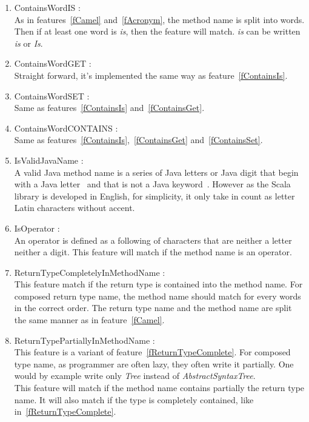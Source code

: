 \documentclass[12pt]{article}
\begin{document}
\begin{enumerate}
\item ContainsWordIS :\label{fContainsIs}\\
	As in features~\ref{fCamel} and~\ref{fAcronym}, the method name is split into words. Then if at least one word is \textit{is}, then the feature will match. \textit{is} can be written \textit{is} or \textit{Is}.
\item ContainsWordGET :\label{fContainsGet}\\
	Straight forward, it's implemented the same way as feature~\ref{fContainsIs}.
\item ContainsWordSET :\label{fContainsSet}\\
	Same as features~\ref{fContainsIs} and~\ref{fContainsGet}.
\item ContainsWordCONTAINS :\label{fContainsContains}\\
	Same as features~\ref{fContainsIs},~\ref{fContainsGet} and~\ref{fContainsSet}.
\item IsValidJavaName :\label{fValidJavaName}\\
	A valid Java method name is a series of Java letters or Java digit that begin with a Java letter~\cite{jls_ident} and that is not a Java keyword~\cite{jls_keyword}. However as the Scala library is developed in English, for simplicity, it only take in count as letter Latin characters without accent.
\item IsOperator :\label{fOperator}\\
	An operator is defined as a following of characters that are neither a letter neither a digit. This feature will match if the method name is an operator.
\item ReturnTypeCompletelyInMethodName :\label{fReturnTypeComplete}\\
	This feature match if the return type is contained into the method name. For composed return type name, the method name should match for every words in the correct order. The return type name and the method name are split the same manner as in feature~\ref{fCamel}. 
\item ReturnTypePartiallyInMethodName :\\
	This feature is a variant of feature~\ref{fReturnTypeComplete}. For composed type name, as programmer are often lazy, they often write it partially. One would by example write only \textit{Tree} instead of \textit{AbstractSyntaxTree}.
\\This feature will match if the method name contains partially the return type name. It will also match if the type is completely contained, like in~\ref{fReturnTypeComplete}.

\end{enumerate}
\end{document}
